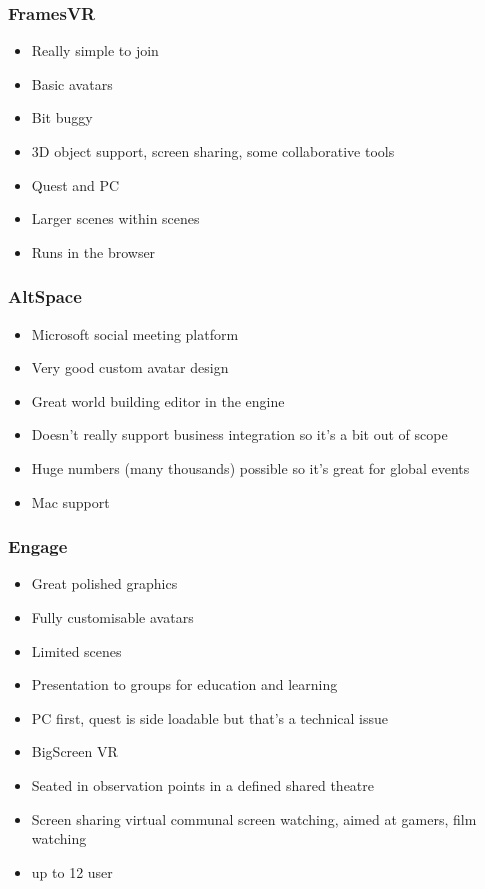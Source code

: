 \subsubsection{FramesVR}
\begin{itemize}
\item Really simple to join
\item Basic avatars
\item Bit buggy
\item 3D object support, screen sharing, some collaborative tools
\item Quest and PC
\item Larger scenes within scenes
\item Runs in the browser
\end{itemize}
\subsubsection{AltSpace}
\begin{itemize}
\item Microsoft social meeting platform
\item Very good custom avatar design
\item Great world building editor in the engine
\item Doesn't really support business integration so it's a bit out of scope
\item Huge numbers (many thousands) possible so it's great for global events
\item Mac support
\end{itemize}
\subsubsection{Engage}
\begin{itemize}
\item Great polished graphics
\item Fully customisable avatars
\item Limited scenes
\item Presentation to groups for education and learning
\item PC first, quest is side loadable but that's a technical issue
\item BigScreen VR
\item Seated in observation points in a defined shared theatre
\item Screen sharing virtual communal screen watching, aimed at gamers, film watching
\item up to 12 user
\end{itemize}

